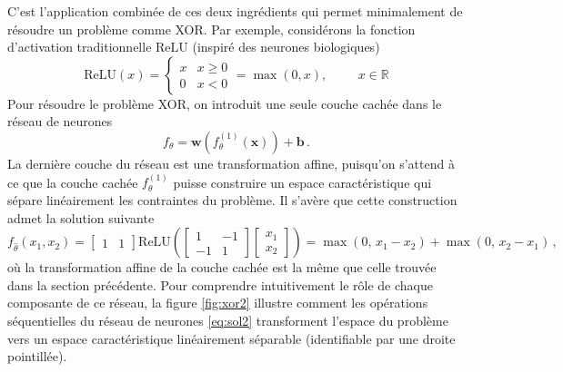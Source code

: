 C'est l'application combinée de ces deux ingrédients qui permet minimalement de résoudre un problème comme XOR. Par exemple, 
considérons la fonction d'activation traditionnelle $\mathrm{ReLU}$ (inspiré des neurones biologiques)
\begin{equation}
        \mathrm{ReLU}(x) = 
        \begin{cases}
                x & x \geq 0 \\
                0 & x < 0
        \end{cases}
        =
        \max(0, x), \hspace{1cm} x \in \mathbb{R}
\end{equation}
Pour résoudre le problème XOR, on introduit une seule couche cachée dans le réseau de neurones
\begin{equation}
        f_\theta = \mathbf{w}(f^{(1)}_\theta(\mathbf{x})) + \mathbf{b}\, .
\end{equation} 
La dernière couche du réseau est une transformation affine, puisqu'on s'attend à ce que la couche cachée $f^{(1)}_\theta$ puisse 
construire un espace caractéristique qui sépare linéairement les contraintes du problème. Il s'avère que cette construction 
admet la solution suivante
\begin{equation}\label{eq:sol2}
        f_{\hat{\theta}}(x_1, x_2) =
        \begin{bmatrix}
                1 & 1 
        \end{bmatrix}
        \mathrm{ReLU}\left(  
        \begin{bmatrix}
        1 & -1 \\ -1 & 1     
        \end{bmatrix}
        \begin{bmatrix}
                x_1 \\ x_2
        \end{bmatrix}
        \right)
        = \max(0,\, x_1 - x_2) + \max(0,\, x_2 - x_1)\, ,
\end{equation}
où la transformation affine de la couche cachée est la même que celle trouvée dans la section précédente. Pour comprendre intuitivement 
le rôle de chaque composante de ce réseau, la figure \ref{fig:xor2} illustre comment les opérations séquentielles du réseau de neurones \eqref{eq:sol2} 
transforment l'espace du problème vers un espace caractéristique linéairement séparable (identifiable par une droite pointillée).

